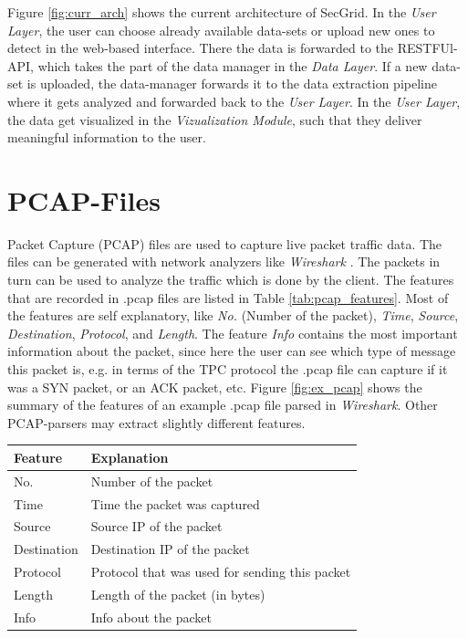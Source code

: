 Figure \ref{fig:curr_arch} shows the current architecture of SecGrid. In the \textit{User Layer}, the user can choose already available data-sets or upload new ones to detect in the web-based interface. There the data is forwarded to the RESTFUl-API, which takes the part of the data manager in the \textit{Data Layer}. If a new data-set is uploaded, the data-manager forwards it to the data extraction pipeline where it gets analyzed and forwarded back to the \textit{User Layer}. In the \textit{User Layer}, the data get visualized in the \textit{Vizualization Module}, such that they deliver meaningful information to the user.

\section{PCAP-Files} \label{pcap}
Packet Capture (PCAP) \cite{pcap} files are used to capture live packet traffic data. The files can be generated with network analyzers like \textit{Wireshark} \cite{wireshark}. The packets in turn can be used to analyze the traffic which is done by the client. The features that are recorded in .pcap files are listed in Table \ref{tab:pcap_features}. Most of the features are self explanatory, like \textit{No.} (Number of the packet), \textit{Time}, \textit{Source}, \textit{Destination}, \textit{Protocol}, and \textit{Length}. The feature \textit{Info} contains the most important information about the packet, since here the user can see which type of message this packet is, e.g. in terms of the TPC protocol the .pcap file can capture if it was a SYN packet, or an ACK packet, etc. Figure \ref{fig:ex_pcap} shows the summary of the features of an example .pcap file parsed in \textit{Wireshark}. Other PCAP-parsers may extract slightly different features.

\begin{center}
\begin{longtable}{ |l|l| }
\hline
Feature & Explanation \\
\hline
\hline
No. & Number of the packet \\
\hline
Time & Time the packet was captured \\
\hline
Source & Source IP of the packet \\
\hline
Destination & Destination IP of the packet \\
\hline
Protocol & Protocol that was used for sending this packet\\
\hline
Length & Length of the packet (in bytes) \\
\hline
Info & Info about the packet \\
\hline
\end{longtable}
\label{tab:pcap_features}
\end{center}

